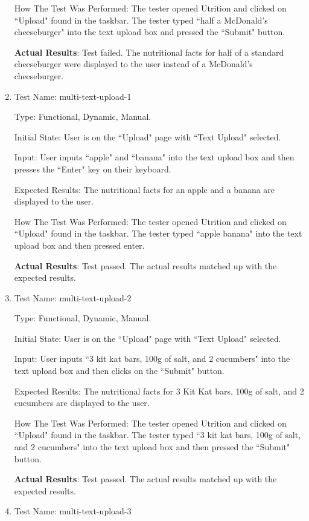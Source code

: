 \documentclass[12pt, titlepage]{article}
\begin{document}
\begin{enumerate}
		How The Test Was Performed: The tester opened Utrition and clicked on ``Upload" found in the taskbar. The tester typed ``half a McDonald's cheeseburger" into the text upload box and pressed the ``Submit" button.
		
		\textbf{Actual Results}: Test failed. The nutritional facts for half of a standard cheeseburger were displayed to the user instead of a McDonald's cheeseburger.
		
		\item{Test Name: multi-text-upload-1}
		
		Type: Functional, Dynamic, Manual.
		
		Initial State: User is on the ``Upload" page with ``Text Upload" selected.
		
		Input: User inputs ``apple" and ``banana" into the text upload box and then presses the ``Enter" key on their keyboard.
		
		Expected Results: The nutritional facts for an apple and a banana are displayed to the user.
		
		How The Test Was Performed: The tester opened Utrition and clicked on ``Upload" found in the taskbar. The tester typed ``apple banana" into the text upload box and then pressed enter. 
		
		\textbf{Actual Results}: Test passed. The actual results matched up with the expected results.
		
		\item{Test Name: multi-text-upload-2}
		
		Type: Functional, Dynamic, Manual.
	
		Initial State: User is on the ``Upload" page with ``Text Upload" selected.
		
		Input: User inputs ``3 kit kat bars, 100g of salt, and 2 cucumbers" into the text upload box and then clicks on the ``Submit" button.
		
		Expected Results: The nutritional facts for 3 Kit Kat bars, 100g of salt, and 2 cucumbers are displayed to the user.
		
		How The Test Was Performed: The tester opened Utrition and clicked on ``Upload" found in the taskbar. The tester typed ``3 kit kat bars, 100g of salt, and 2 cucumbers" into the text upload box and then pressed the ``Submit" button.
		
		\textbf{Actual Results}: Test passed. The actual results matched up with the expected results.
		
		\item{Test Name: multi-text-upload-3}
		

\end{enumerate}
\end{document}

